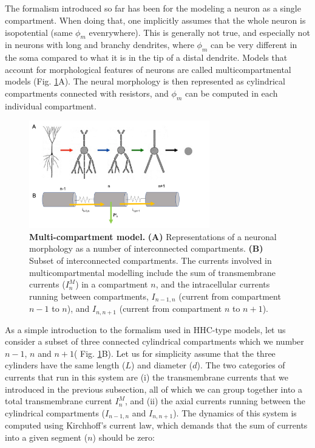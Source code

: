 \subsection{}
The formalism introduced so far has been for the modeling a neuron as a single compartment. When doing that, one implicitly assumes that the whole neuron is isopotential (same $\phi_m$ evenrywhere). This is generally not true, and especially not in neurons with long and branchy dendrites, where $\phi_m$ can be very different in the soma compared to what it is in the tip of a distal dendrite. Models that account for morphological features of neurons are called multicompartmental models (Fig. \ref{Neuron:fig:multikompisen}A). The neural morphology is then represented as cylindrical compartments connected with resistors, and $\phi_m$ can be computed in each individual compartment. 

\begin{figure}[!ht]
\begin{center}
\includegraphics[width=0.7\textwidth]{Figures/Neuron/Multikompis.png}
\end{center}
\caption{\textbf{Multi-compartment model.} {\bf (A)} Representations of a neuronal morphology as a number of interconnected compartments. {\bf (B)} Subset of interconnected compartments. The currents involved in multicompartmental modelling include the sum of transmembrane currents ($I^M_n$) in a compartment $n$, and the intracellular currents running between 
compartments, $I_{n-1,n}$ (current from compartment $n-1$ to $n$), and $I_{n,n+1}$ (current from compartment $n$ to $n+1$).}
\label{Neuron:fig:multikompisen}
\end{figure}

As a simple introduction to the formalism used in HHC-type models, let us consider a subset of three connected cylindrical compartments which we number $n-1$, $n$ and $n+1$( Fig. \ref{Neuron:fig:multikompisen}B). Let us for simplicity assume that the three cylinders have the same length ($L$) and diameter ($d$). The two categories of currents that run in this system are (i) the transmembrane currents that we introduced in the previous subsection, all of which we can group together into a total transmembrane current $I^M_n$, and (ii) the axial currents running between the cylindrical compartments ($I_{n-1,n}$ and $I_{n,n+1}$). The dynamics of this system is computed using Kirchhoff's current law, which demands that the sum of currents into a given segment ($n$) should be zero:

